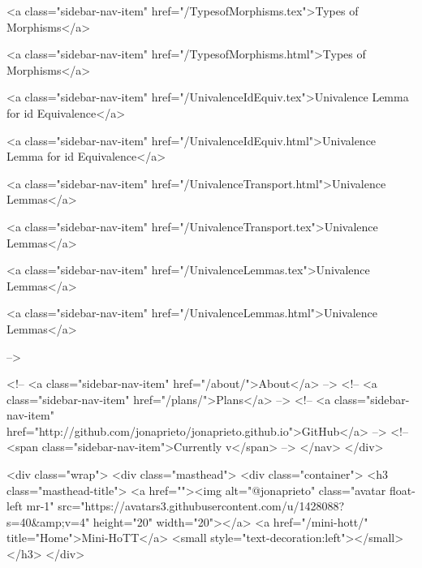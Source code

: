       
    
      
        
          <a class="sidebar-nav-item" href="/TypesofMorphisms.tex">Types of Morphisms</a>
        
      
    
      
        
          <a class="sidebar-nav-item" href="/TypesofMorphisms.html">Types of Morphisms</a>
        
      
    
      
        
          <a class="sidebar-nav-item" href="/UnivalenceIdEquiv.tex">Univalence Lemma for id Equivalence</a>
        
      
    
      
        
          <a class="sidebar-nav-item" href="/UnivalenceIdEquiv.html">Univalence Lemma for id Equivalence</a>
        
      
    
      
        
          <a class="sidebar-nav-item" href="/UnivalenceTransport.html">Univalence Lemmas</a>
        
      
    
      
        
          <a class="sidebar-nav-item" href="/UnivalenceTransport.tex">Univalence Lemmas</a>
        
      
    
      
        
          <a class="sidebar-nav-item" href="/UnivalenceLemmas.tex">Univalence Lemmas</a>
        
      
    
      
        
          <a class="sidebar-nav-item" href="/UnivalenceLemmas.html">Univalence Lemmas</a>
        
      
     -->

    <!-- <a class="sidebar-nav-item" href="/about/">About</a> -->
    <!-- <a class="sidebar-nav-item" href="/plans/">Plans</a> -->
    <!-- <a class="sidebar-nav-item" href="http://github.com/jonaprieto/jonaprieto.github.io">GitHub</a> -->
    <!-- <span class="sidebar-nav-item">Currently v</span> -->
  </nav>
</div>

    <div class="wrap">
      <div class="masthead">
        <div class="container">
          <h3 class="masthead-title">
            <a href=""><img alt="@jonaprieto" class="avatar float-left mr-1" src="https://avatars3.githubusercontent.com/u/1428088?s=40&amp;v=4" height="20" width="20"></a>
            <a href="/mini-hott/" title="Home">Mini-HoTT</a>
            <small style="text-decoration:left"></small>
          </h3>
        </div>
      
